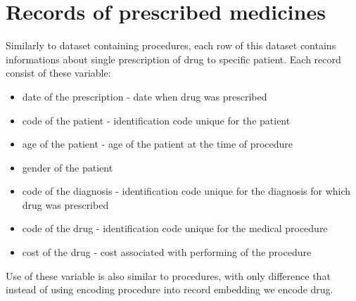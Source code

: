 \section{Records of prescribed medicines}

Similarly to dataset containing procedures, each row of this dataset contains informations about single prescription of drug to specific patient.  Each record consist of these variable:
\begin{itemize}
	\item date of the prescription - date when drug was prescribed
	\item code of the patient - identification code unique for the patient
	\item age of the patient - age of the patient at the time of procedure
	\item gender of the patient
	\item code of the diagnosis - identification code unique for the diagnosis for which drug was prescribed
	\item code of the drug - identification code unique for the medical procedure 
	\item cost of the drug - cost associated with performing of the procedure
\end{itemize}

Use of these variable is also similar to procedures, with only difference that instead of using encoding procedure into record embedding we encode drug.

